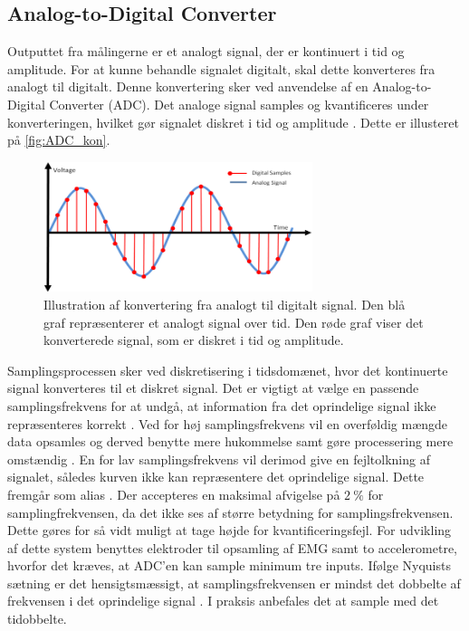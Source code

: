 \subsection{Analog-to-Digital Converter} \label{sec:ADC_teori}
Outputtet fra målingerne er et analogt signal, der er kontinuert i tid og amplitude. 
For at kunne behandle signalet digitalt, skal dette konverteres fra analogt til digitalt. Denne konvertering sker ved anvendelse af en Analog-to-Digital Converter (ADC). 
Det analoge signal samples og kvantificeres under konverteringen, hvilket gør signalet diskret i tid og amplitude \citep{webster1998, morre2003}. 
Dette er illusteret på \autoref{fig:ADC_kon}. 

\begin{figure}[H]
\centering
\includegraphics[width=0.7\textwidth]{figures/problemloesning/adc}
\caption{Illustration af konvertering fra analogt til digitalt signal. Den blå graf repræsenterer et analogt signal over tid. Den røde graf viser det konverterede signal, som er diskret i tid og amplitude.}
\label{fig:ADC_kon}
\end{figure}

\noindent
Samplingsprocessen sker ved diskretisering i tidsdomænet, hvor det kontinuerte signal konverteres til et diskret signal. 
Det er vigtigt at vælge en passende samplingsfrekvens for at undgå, at information fra det oprindelige signal ikke repræsenteres korrekt \citep{morre2003}. 
Ved for høj samplingsfrekvens vil en overføldig mængde data opsamles og derved benytte mere hukommelse samt gøre processering mere omstændig \citep{wolf2004}. 
En for lav samplingsfrekvens vil derimod give en fejltolkning af signalet, således kurven ikke kan repræsentere det oprindelige signal. Dette fremgår som alias \citep{morre2003}. 
Der accepteres en maksimal afvigelse på $2~\%$ for samplingfrekvensen, da det ikke ses af større betydning for samplingsfrekvensen. 
Dette gøres for så vidt muligt at tage højde for kvantificeringsfejl. 
For udvikling af dette system benyttes elektroder til opsamling af EMG samt to accelerometre, hvorfor det kræves, at ADC'en kan sample minimum tre inputs.
Ifølge Nyquists sætning er det hensigtsmæssigt, at samplingsfrekvensen er mindst det dobbelte af frekvensen i det oprindelige signal \citep{morre2003}. 
I praksis anbefales det at sample med det tidobbelte.

